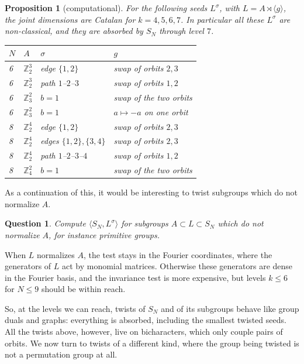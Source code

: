 \documentclass[11pt]{amsart}
\newtheorem{proposition}[theorem]{Proposition}
\newtheorem{question}[theorem]{Question}
\theoremstyle{definition}
\theoremstyle{remark}
\theoremstyle{plain}
\numberwithin{equation}{section}
\numberwithin{table}{section}
\newcommand{\Z}{\mathbb Z}
\begin{document}
\begin{proposition}[computational]\label{prop:twsub}
For the following seeds $L^\sigma$, with $L=A\rtimes\langle g\rangle$, the joint dimensions are Catalan for $k=4,5,6,7$. In particular all these $L^\sigma$ are non-classical, and they are absorbed by $S_N$ through level $7$.
\begin{center}
\begin{tabular}{@{}llll@{}}\toprule
$N$ & $A$ & $\sigma$ & $g$\\\midrule
6 & $\Z_2^3$ & edge $\{1,2\}$ & swap of orbits $2,3$\\
6 & $\Z_2^3$ & path $1$--$2$--$3$ & swap of orbits $1,2$\\
6 & $\Z_3^2$ & $b=1$ & swap of the two orbits\\
6 & $\Z_3^2$ & $b=1$ & $a\mapsto-a$ on one orbit\\
8 & $\Z_2^4$ & edge $\{1,2\}$ & swap of orbits $2,3$\\
8 & $\Z_2^4$ & edges $\{1,2\},\{3,4\}$ & swap of orbits $2,3$\\
8 & $\Z_2^4$ & path $1$--$2$--$3$--$4$ & swap of orbits $1,2$\\
8 & $\Z_4^2$ & $b=1$ & swap of the two orbits\\\bottomrule
\end{tabular}
\end{center}
\end{proposition}

As a continuation of this, it would be interesting to twist subgroups which do not normalize $A$.

\begin{question}\label{qu:nonnormal}
Compute $\langle S_N,L^\sigma\rangle$ for subgroups $A\subset L\subset S_N$ which do not normalize $A$, for instance primitive groups.
\end{question}

When $L$ normalizes $A$, the test stays in the Fourier coordinates, where the generators of $L$ act by monomial matrices. Otherwise these generators are dense in the Fourier basis, and the invariance test is more expensive, but levels $k\le6$ for $N\le9$ should be within reach.

So, at the levels we can reach, twists of $S_N$ and of its subgroups behave like group duals and graphs: everything is absorbed, including the smallest twisted seeds. All the twists above, however, live on bicharacters, which only couple pairs of orbits. We now turn to twists of a different kind, where the group being twisted is not a permutation group at all.
\end{document}
